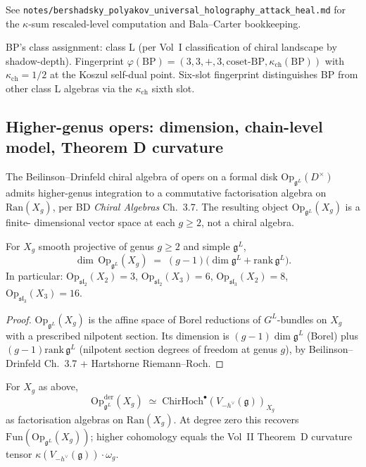 \documentclass[11pt]{article}
\begin{document}
\begin{remark}
See \texttt{notes/bershadsky\_polyakov\_universal\_holography\_attack\_heal.md}
for the $\kappa$-sum rescaled-level computation and Bala--Carter
bookkeeping.

BP's class assignment: class L (per Vol~I classification of
chiral landscape by shadow-depth). Fingerprint
$\varphi(\mathrm{BP}) = (3, 3, +, 3, \mathrm{coset\text{-}BP},
\kappa_{\mathrm{ch}}(\mathrm{BP}))$ with $\kappa_{\mathrm{ch}}
= 1/2$ at the Koszul self-dual point. Six-slot fingerprint
distinguishes BP from other class L algebras via the
$\kappa_{\mathrm{ch}}$ sixth slot.

\subsection{Higher-genus opers: dimension, chain-level model, Theorem D curvature}
\label{subsec:higher-genus-opers}

The Beilinson--Drinfeld chiral algebra of opers on a formal disk
$\mathrm{Op}_{\mathfrak{g}^L}(D^{\times})$ admits higher-genus
integration to a commutative factorisation algebra on
$\mathrm{Ran}(X_g)$, per BD \emph{Chiral Algebras} Ch.~3.7. The
resulting object $\mathrm{Op}_{\mathfrak{g}^L}(X_g)$ is a finite-
dimensional vector space at each $g \ge 2$, not a chiral algebra.

\begin{proposition}
\label{prop:higher-genus-oper-dim}
For $X_g$ smooth projective of genus $g \ge 2$ and simple
$\mathfrak{g}^L$,
\[
  \dim\,\mathrm{Op}_{\mathfrak{g}^L}(X_g)
  \;=\;
  (g - 1)\bigl(\dim\mathfrak{g}^L
    + \mathrm{rank}\,\mathfrak{g}^L\bigr).
\]
In particular: $\mathrm{Op}_{\mathfrak{sl}_2}(X_2) = 3$,
$\mathrm{Op}_{\mathfrak{sl}_2}(X_3) = 6$,
$\mathrm{Op}_{\mathfrak{sl}_3}(X_2) = 8$,
$\mathrm{Op}_{\mathfrak{sl}_3}(X_3) = 16$.
\end{proposition}

\begin{proof}
$\mathrm{Op}_{\mathfrak{g}^L}(X_g)$ is the affine space of Borel
reductions of $G^L$-bundles on $X_g$ with a prescribed nilpotent
section. Its dimension is $(g-1)\dim\mathfrak{g}^L$ (Borel) plus
$(g-1)\mathrm{rank}\,\mathfrak{g}^L$ (nilpotent section degrees of
freedom at genus $g$), by Beilinson--Drinfeld Ch.~3.7 + Hartshorne
Riemann--Roch.
\end{proof}

\begin{theorem}
\label{thm:higher-genus-chain-model}
For $X_g$ as above,
\[
  \mathrm{Op}^{\mathrm{der}}_{\mathfrak{g}^L}(X_g)
  \;\simeq\;
  \mathrm{ChirHoch}^{\bullet}(V_{-h^{\vee}}(\mathfrak{g}))_{X_g}
\]
as factorisation algebras on $\mathrm{Ran}(X_g)$. At degree zero
this recovers $\mathrm{Fun}(\mathrm{Op}_{\mathfrak{g}^L}(X_g))$;
higher cohomology equals the Vol~II Theorem~D curvature tensor
$\kappa(V_{-h^{\vee}}(\mathfrak{g})) \cdot \omega_g$.
\end{theorem}


\end{remark}
\end{document}
